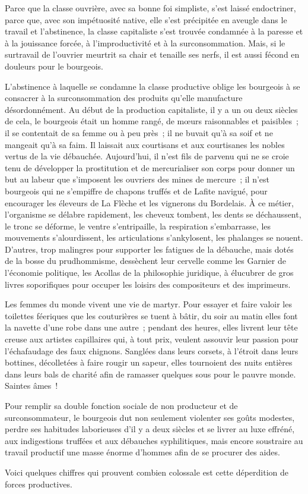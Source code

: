 \documentclass[french,twoside]{book} %
\begin{document}
Parce que la classe ouvrière, avec sa bonne foi simpliste, s’est laissé endoctriner, parce que, avec son impétuosité native, elle s’est précipitée en aveugle dans le travail et l’abstinence, la classe capitaliste s’est trouvée condamnée à la paresse et à la jouissance forcée, à l’improductivité et à la surconsommation. Mais, si le surtravail de l’ouvrier meurtrit sa chair et tenaille ses nerfs, il est aussi fécond en douleurs pour le bourgeois.\par
L’abstinence à laquelle se condamne la classe productive oblige les bourgeois à se consacrer à la surconsommation des produits qu’elle manufacture désordonnément. Au début de la production capitaliste, il y a un ou deux siècles de cela, le bourgeois était un homme rangé, de mœurs raisonnables et paisibles ; il se contentait de sa femme ou à peu près ; il ne buvait qu’à sa soif et ne mangeait qu’à sa faim. Il laissait aux courtisans et aux courtisanes les nobles vertus de la vie débauchée. Aujourd’hui, il n’est fils de parvenu qui ne se croie tenu de développer la prostitution et de mercurialiser son corps pour donner un but au labeur que s’imposent les ouvriers des mines de mercure ; il n’est bourgeois qui ne s’empiffre de chapons truffés et de Lafite navigué, pour encourager les éleveurs de La Flèche et les vignerons du Bordelais. À ce métier, l’organisme se délabre rapidement, les cheveux tombent, les dents se déchaussent, le tronc se déforme, le ventre s’entripaille, la respiration s’embarrasse, les mouvements s’alourdissent, les articulations s’ankylosent, les phalanges se nouent. D’autres, trop malingres pour supporter les fatigues de la débauche, mais dotés de la bosse du prudhommisme, dessèchent leur cervelle comme les Garnier de l’économie politique, les Acollas de la philosophie juridique, à élucubrer de gros livres soporifiques pour occuper les loisirs des compositeurs et des imprimeurs.\par
Les femmes du monde vivent une vie de martyr. Pour essayer et faire valoir les toilettes féeriques que les couturières se tuent à bâtir, du soir au matin elles font la navette d’une robe dans une autre ; pendant des heures, elles livrent leur tête creuse aux artistes capillaires qui, à tout prix, veulent assouvir leur passion pour l’échafaudage des faux chignons. Sanglées dans leurs corsets, à l’étroit dans leurs bottines, décolletées à faire rougir un sapeur, elles tournoient des nuits entières dans leurs bals de charité afin de ramasser quelques sous pour le pauvre monde. Saintes âmes !\par
Pour remplir sa double fonction sociale de non producteur et de surconsommateur, le bourgeois dut non seulement violenter ses goûts modestes, perdre ses habitudes laborieuses d’il y a deux siècles et se livrer au luxe effréné, aux indigestions truffées et aux débauches syphilitiques, mais encore soustraire au travail productif une masse énorme d’hommes afin de se procurer des aides.\par
Voici quelques chiffres qui prouvent combien colossale est cette déperdition de forces productives.\par
\end{document}
